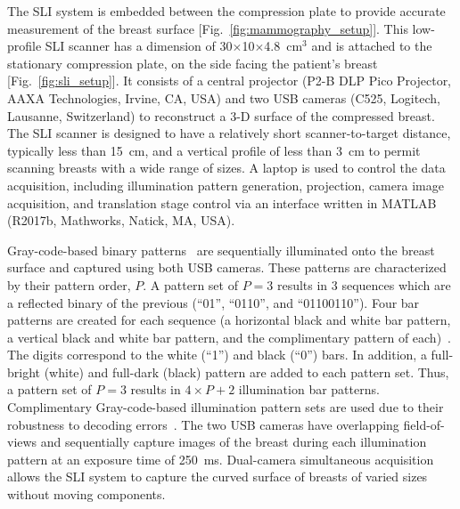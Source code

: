 The \ac{SLI} system is embedded between the compression plate to provide accurate measurement of the breast surface [Fig.~\ref{fig:mammography_setup}]. This low-profile \ac{SLI} scanner has a dimension of 30$\times$10$\times$4.8~cm$^3$ and is attached to the stationary compression plate, on the side facing the patient's breast [Fig.~\ref{fig:sli_setup}]. It consists of a central projector (P2-B DLP Pico Projector, AAXA Technologies, Irvine, CA, USA) and two USB cameras (C525, Logitech, Lausanne, Switzerland) to reconstruct a 3-D surface of the compressed breast. The \ac{SLI} scanner is designed to have a relatively short scanner-to-target distance, typically less than 15~cm, and a vertical profile of less than 3~cm to permit scanning breasts with a wide range of sizes. A laptop is used to control the data acquisition, including illumination pattern generation, projection, camera image acquisition, and translation stage control via an interface written in MATLAB (R2017b, Mathworks, Natick, MA, USA).

Gray-code-based binary patterns~\cite{Inokuchi1984} are sequentially illuminated onto the breast surface and captured using both USB cameras. These patterns are characterized by their pattern order, $P$. A pattern set of $P=3$ results in 3 sequences which are a reflected binary of the previous (``01'', ``0110'', and ``01100110''). Four bar patterns are created for each sequence (a horizontal black and white bar pattern, a vertical black and white bar pattern, and the complimentary pattern of each)~\cite{Sels2019}. The digits correspond to the white (``1'') and black (``0'') bars. In addition, a full-bright (white) and full-dark (black) pattern are added to each pattern set. Thus, a pattern set of $P=3$ results in $4\times P+2$ illumination bar patterns. Complimentary Gray-code-based illumination pattern sets are used due to their robustness to decoding errors~\cite{Moreno2012}. The two USB cameras have overlapping field-of-views and sequentially capture images of the breast during each illumination pattern at an exposure time of 250~ms. Dual-camera simultaneous acquisition allows the \ac{SLI} system to capture the curved surface of breasts of varied sizes without moving components. 

